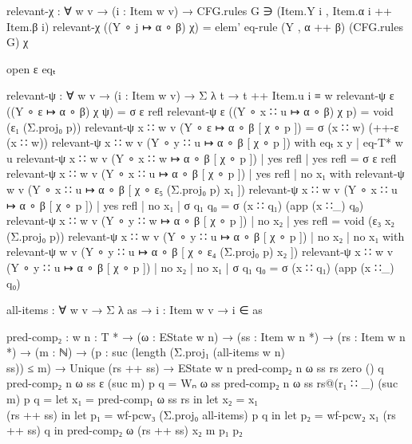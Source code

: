 {\begin{code}
			  relevant-χ : ∀ {w v} → (i : Item w v) → CFG.rules G ∋ (Item.Y i , Item.α i ++ Item.β i)
			  relevant-χ ((Y ∘ j ↦ α ∘ β) {χ}) = elem' eq-rule (Y , α ++ β) (CFG.rules G) χ

			  open ε eqₜ

			  relevant-ψ : ∀ {w v} → (i : Item w v) → Σ λ t → t ++ Item.u i ≡ w
			  relevant-ψ {ε} ((Y ∘ ε ↦ α ∘ β) {χ} {ψ}) = σ ε refl
			  relevant-ψ {ε} ((Y ∘ x ∷ u ↦ α ∘ β) {χ} {p}) = void (ε₁ (Σ.proj₀ p))
			  relevant-ψ {x ∷ w} {v} (Y ∘ ε ↦ α ∘ β [ χ ∘ p ]) = σ (x ∷ w) (++-ε (x ∷ w))
			  relevant-ψ {x ∷ w} {v} (Y ∘ y ∷ u ↦ α ∘ β [ χ ∘ p ]) with eqₜ x y | eq-T* w u
			  relevant-ψ {x ∷ w} {v} (Y ∘ x ∷ w ↦ α ∘ β [ χ ∘ p ]) | yes refl | yes refl = σ ε refl
			  relevant-ψ {x ∷ w} {v} (Y ∘ x ∷ u ↦ α ∘ β [ χ ∘ p ]) | yes refl | no x₁ with relevant-ψ {w} {v} (Y ∘ x ∷ u ↦ α ∘ β [ χ ∘ ε₅ (Σ.proj₀ p) x₁ ])
			  relevant-ψ {x ∷ w} {v} (Y ∘ x ∷ u ↦ α ∘ β [ χ ∘ p ]) | yes refl | no x₁ | σ q₁ q₀ = σ (x ∷ q₁) (app (x ∷_) q₀)
			  relevant-ψ {x ∷ w} {v} (Y ∘ y ∷ w ↦ α ∘ β [ χ ∘ p ]) | no x₂    | yes refl = void (ε₃ x₂ (Σ.proj₀ p))
			  relevant-ψ {x ∷ w} {v} (Y ∘ y ∷ u ↦ α ∘ β [ χ ∘ p ]) | no x₂    | no x₁ with relevant-ψ {w} {v} (Y ∘ y ∷ u ↦ α ∘ β [ χ ∘ ε₄ (Σ.proj₀ p) x₂ ])
			  relevant-ψ {x ∷ w} {v} (Y ∘ y ∷ u ↦ α ∘ β [ χ ∘ p ]) | no x₂    | no x₁ | σ q₁ q₀ = σ (x ∷ q₁) (app (x ∷_) q₀)

		\end{code}}
		\begin{code}
			  all-items : ∀ {w} {v} → Σ λ as → {i : Item w v} → i ∈ as
		\end{code}

		\begin{code}
			  pred-comp₂ : {w n : T *} →
			    (ω : EState w n) →
			    (ss : Item w n *) →
			    (rs : Item w n *) →
			    (m : ℕ) →
			    (p : suc (length (Σ.proj₁ (all-items {w} {n}) \\ ss)) ≤ m) →
			    Unique (rs ++ ss) →
			    EState w n
			  pred-comp₂ {n} ω ss rs zero () q
			  pred-comp₂ {n} ω ss ε (suc m) p q = Wₙ ω ss
			  pred-comp₂ {n} ω ss rs@(r₁ ∷ _) (suc m) p q =
			    let x₁ = pred-comp₁ ω ss rs in
			    let x₂ = x₁ \\ (rs ++ ss) in
			    let p₁ = wf-pcw₃ (Σ.proj₀ all-items) p q in
			    let p₂ = wf-pcw₂ x₁ (rs ++ ss) q in
			    pred-comp₂ ω (rs ++ ss) x₂ m p₁ p₂
		\end{code}

